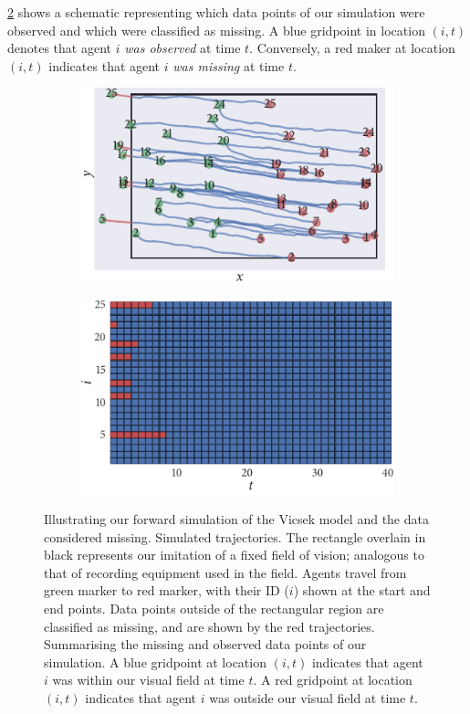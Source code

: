\cref{subfig:beg_missing} shows a schematic representing which data points of
our simulation were observed and which were classified as missing. A blue
gridpoint in location $(i, t)$ denotes that agent $i$ \emph{was observed} at
time $t$. Conversely, a red maker at location $(i, t)$ indicates that agent $i$
\emph{was missing} at time $t$.

\begin{figure}[tbp]
  \begin{subfigure}[b]{0.5\textwidth}
    \includegraphics{beg/data.pdf}
    \caption{}
    \label{subfig:beg_data}
  \end{subfigure}%
  \begin{subfigure}[b]{0.5\textwidth}
    \includegraphics{beg/missing_array.pdf}
    \caption{}
    \label{subfig:beg_missing}
  \end{subfigure}
  \caption{Illustrating our forward simulation of the Vicsek model and the
    data considered missing.  Simulated trajectories.
    The rectangle overlain in black represents our imitation of a fixed
    field of vision; analogous to that of recording equipment used in the
    field. Agents travel from green marker to red marker, with their ID ($i$)
    shown at the start and end points. Data points outside of the rectangular
    region are classified as missing, and are shown by the red trajectories.
     Summarising the missing and observed data
    points of our simulation. A blue gridpoint at location $(i, t)$ indicates
    that agent $i$ was within our visual field at time $t$. A red gridpoint at
    location $(i, t)$ indicates that agent $i$ was outside our visual field
    at time $t$.}
  \label{fig:beg_data}
\end{figure}


